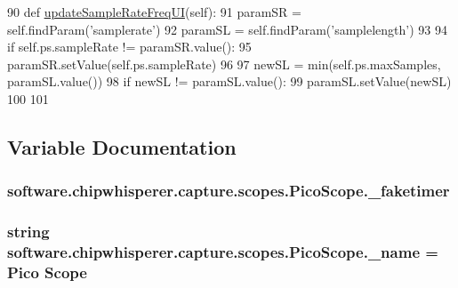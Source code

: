 \begin{DoxyCode}
90     \textcolor{keyword}{def }\hyperlink{namespacesoftware_1_1chipwhisperer_1_1capture_1_1scopes_1_1PicoScope_a387dc036eac5d58fcf4d69e8dd3782bd}{updateSampleRateFreqUI}(self):
91         paramSR = self.findParam(\textcolor{stringliteral}{'samplerate'})
92         paramSL = self.findParam(\textcolor{stringliteral}{'samplelength'})
93 
94         \textcolor{keywordflow}{if} self.ps.sampleRate != paramSR.value():
95             paramSR.setValue(self.ps.sampleRate)
96 
97         newSL = min(self.ps.maxSamples, paramSL.value())
98         \textcolor{keywordflow}{if} newSL != paramSL.value():
99             paramSL.setValue(newSL)
100 
101 
\end{DoxyCode}


\subsection{Variable Documentation}
\hypertarget{namespacesoftware_1_1chipwhisperer_1_1capture_1_1scopes_1_1PicoScope_ac64cd74bf8420740d70799da3f3f1566}{}
\subsubsection[{\+\_\+faketimer}]{\setlength{\rightskip}{0pt plus 5cm}software.\+chipwhisperer.\+capture.\+scopes.\+Pico\+Scope.\+\_\+faketimer}\label{namespacesoftware_1_1chipwhisperer_1_1capture_1_1scopes_1_1PicoScope_ac64cd74bf8420740d70799da3f3f1566}
\hypertarget{namespacesoftware_1_1chipwhisperer_1_1capture_1_1scopes_1_1PicoScope_a2f1e9b3bced098087fbeb2f541e3ef07}{}
\subsubsection[{\+\_\+name}]{\setlength{\rightskip}{0pt plus 5cm}string software.\+chipwhisperer.\+capture.\+scopes.\+Pico\+Scope.\+\_\+name = \textquotesingle{}Pico Scope\textquotesingle{}}\label{namespacesoftware_1_1chipwhisperer_1_1capture_1_1scopes_1_1PicoScope_a2f1e9b3bced098087fbeb2f541e3ef07}
\hypertarget{namespacesoftware_1_1chipwhisperer_1_1capture_1_1scopes_1_1PicoScope_ad5aad75f7e8408e9f666947678d187b0}{}
